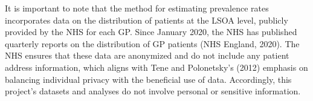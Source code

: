 It is important to note that the method for estimating prevalence rates incorporates data on the distribution of patients at the LSOA level, publicly provided by the NHS for each GP. Since January 2020, the NHS has published quarterly reports on the distribution of GP patients (NHS England, 2020). The NHS ensures that these data are anonymized and do not include any patient address information, which aligns with Tene and Polonetsky's (2012) emphasis on balancing individual privacy with the beneficial use of data. Accordingly, this project's datasets and analyses do not involve personal or sensitive information.